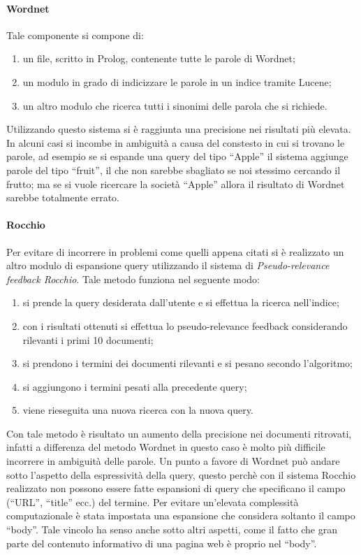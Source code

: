 \paragraph{Wordnet}
Tale componente si compone di:
\begin{enumerate}
\item un file, scritto in Prolog, contenente tutte le parole di Wordnet;
\item un modulo in grado di indicizzare le parole in un indice tramite Lucene;
\item un altro modulo che ricerca tutti i sinonimi delle parola che si richiede.
\end{enumerate}
Utilizzando questo sistema si è raggiunta una precisione nei risultati più elevata. In alcuni casi si incombe in ambiguità a causa del constesto in cui si trovano le parole, ad esempio se si espande una query del tipo ``Apple'' il sistema aggiunge parole del tipo ``fruit'', il che non sarebbe sbagliato se noi stessimo cercando il frutto; ma se si vuole ricercare la società ``Apple'' allora il risultato di Wordnet sarebbe totalmente errato.
\paragraph{Rocchio}
Per evitare di incorrere in problemi come quelli appena citati si è realizzato un altro modulo di espansione query utilizzando il sistema di \textit{Pseudo-relevance feedback Rocchio}. Tale metodo funziona nel seguente modo:
\begin{enumerate}
\item si prende la query desiderata dall'utente e si effettua la ricerca nell'indice;
\item con i risultati ottenuti si effettua lo pseudo-relevance feedback considerando rilevanti i primi 10 documenti;
\item si prendono i termini dei documenti rilevanti e si pesano secondo l'algoritmo;
\item si aggiungono i termini pesati alla precedente query;
\item viene rieseguita una nuova ricerca con la nuova query.
\end{enumerate}
Con tale metodo è risultato un aumento della precisione nei documenti ritrovati, infatti a differenza del metodo Wordnet in questo caso è molto più difficile incorrere in ambiguità delle parole. Un punto a favore di Wordnet può andare sotto l'aspetto della espressività della query, questo perchè con il sistema Rocchio realizzato non possono essere fatte espansioni di query che specificano il campo (``URL'', ``title'' ecc.) del termine. Per evitare un'elevata complessità computazionale è stata impostata una espansione che considera soltanto il campo ``body''. Tale vincolo ha senso anche sotto altri aspetti, come il fatto che gran parte del contenuto informativo di una pagina web è proprio nel ``body''.